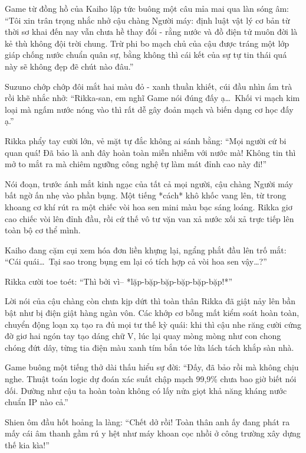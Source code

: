 \documentclass[../main.tex]{subfiles}
\begin{document}
Game từ đồng hồ của Kaiho lập tức buông một câu mỉa mai qua làn sóng âm: ``Tôi xin trân trọng nhắc nhở cậu chàng Người máy: định luật vật lý cơ bản từ thời sơ khai đến nay vẫn chưa hề thay đổi - rằng nước và đồ điện tử muôn đời là kẻ thù không đội trời chung. Trừ phi bo mạch chủ của cậu được tráng một lớp giáp chống nước chuẩn quân sự, bằng không thì cái kết của sự tự tin thái quá này sẽ không đẹp đẽ chút nào đâu.''

Suzuno chớp chớp đôi mắt hai màu đỏ - xanh thuần khiết, cúi đầu nhìn ấm trà rồi khẽ nhắc nhở: ``Rikka-san, em nghĩ Game nói đúng đấy ạ\dots\ Khối vi mạch kim loại mà ngấm nước nóng vào thì rất dễ gây đoản mạch và biến dạng cơ học đấy ạ.''

Rikka phẩy tay cười lớn, vẻ mặt tự đắc không ai sánh bằng: ``Mọi người cứ bi quan quá! Đã bảo là anh đây hoàn toàn miễn nhiễm với nước mà! Không tin thì mở to mắt ra mà chiêm ngưỡng công nghệ tự làm mát đỉnh cao này đi!''

Nói đoạn, trước ánh mắt kinh ngạc của tất cả mọi người, cậu chàng Người máy bất ngờ ấn nhẹ vào phần bụng. Một tiếng *cách* khô khốc vang lên, từ trong khoang cơ khí rút ra một chiếc vòi hoa sen mini màu bạc sáng loáng. Rikka giơ cao chiếc vòi lên đỉnh đầu, rồi cứ thế vô tư vặn van xả nước xối xả trực tiếp lên toàn bộ cơ thể mình.


Kaiho đang cặm cụi xem hóa đơn liền khựng lại, ngẩng phắt đầu lên trố mắt: ``Cái quái\dots\ Tại sao trong bụng em lại có tích hợp cả vòi hoa sen vậy\dots?''

Rikka cười toe toét: ``Thì bởi vì-- *lặp-bặp-bặp-bặp-bặp-bặp!*''

Lời nói của cậu chàng còn chưa kịp dứt thì toàn thân Rikka đã giật nảy lên bần bật như bị điện giật hàng ngàn vôn. Các khớp cơ bỗng mất kiểm soát hoàn toàn, chuyển động loạn xạ tạo ra đủ mọi tư thế kỳ quái: khi thì cậu nhe răng cười cứng đờ giơ hai ngón tay tạo dáng chữ V, lúc lại quay mòng mòng như con chong chóng đứt dây, từng tia điện màu xanh tím bắn tóe lửa lách tách khắp sàn nhà.

Game buông một tiếng thở dài thấu hiểu sự đời: ``Đấy, đã bảo rồi mà không chịu nghe. Thuật toán logic dự đoán xác suất chập mạch 99,9\% chưa bao giờ biết nói dối. Dường như cậu ta hoàn toàn không có lấy nửa giọt khả năng kháng nước chuẩn IP nào cả.''

Shien ôm đầu hốt hoảng la làng: ``Chết dở rồi! Toàn thân anh ấy đang phát ra mấy cái âm thanh gầm rú y hệt như máy khoan cọc nhồi ở công trường xây dựng thế kia kìa!''
\end{document}
